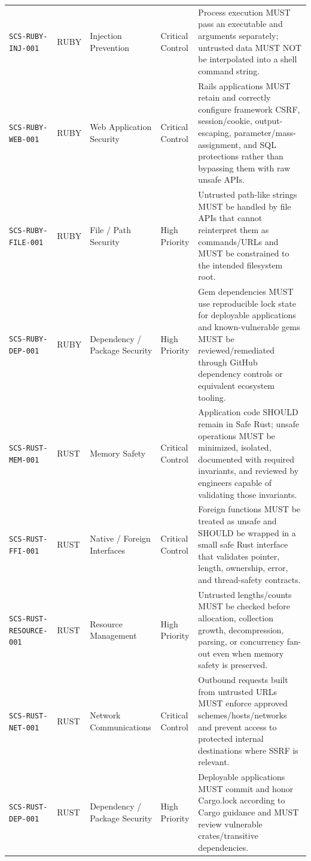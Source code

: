 \documentclass[10pt,letterpaper]{article}
\newcommand{\code}[1]{\begingroup\small\ttfamily\def\UrlFont{\ttfamily}\nolinkurl{#1}\endgroup}
\begin{document}
\begin{landscape}
\begin{longtable}{@{}P{1.3in}P{0.8in}P{1.45in}P{1.0in}P{4.65in}@{}}
\code{SCS-RUBY-INJ-001} & RUBY & Injection Prevention & Critical Control & Process execution MUST pass an executable and arguments separately; untrusted data MUST NOT be interpolated into a shell command string.\\
\code{SCS-RUBY-WEB-001} & RUBY & Web Application Security & Critical Control & Rails applications MUST retain and correctly configure framework CSRF, session/cookie, output-escaping, parameter/mass-assignment, and SQL protections rather than bypassing them with raw unsafe APIs.\\
\code{SCS-RUBY-FILE-001} & RUBY & File / Path Security & High Priority & Untrusted path-like strings MUST be handled by file APIs that cannot reinterpret them as commands/URLs and MUST be constrained to the intended filesystem root.\\
\code{SCS-RUBY-DEP-001} & RUBY & Dependency / Package Security & High Priority & Gem dependencies MUST use reproducible lock state for deployable applications and known-vulnerable gems MUST be reviewed/remediated through GitHub dependency controls or equivalent ecosystem tooling.\\
\code{SCS-RUST-MEM-001} & RUST & Memory Safety & Critical Control & Application code SHOULD remain in Safe Rust; unsafe operations MUST be minimized, isolated, documented with required invariants, and reviewed by engineers capable of validating those invariants.\\
\code{SCS-RUST-FFI-001} & RUST & Native / Foreign Interfaces & Critical Control & Foreign functions MUST be treated as unsafe and SHOULD be wrapped in a small safe Rust interface that validates pointer, length, ownership, error, and thread-safety contracts.\\
\code{SCS-RUST-RESOURCE-001} & RUST & Resource Management & High Priority & Untrusted lengths/counts MUST be checked before allocation, collection growth, decompression, parsing, or concurrency fan-out even when memory safety is preserved.\\
\code{SCS-RUST-NET-001} & RUST & Network Communications & Critical Control & Outbound requests built from untrusted URLs MUST enforce approved schemes/hosts/networks and prevent access to protected internal destinations where SSRF is relevant.\\
\code{SCS-RUST-DEP-001} & RUST & Dependency / Package Security & High Priority & Deployable applications MUST commit and honor Cargo.lock according to Cargo guidance and MUST review vulnerable crates/transitive dependencies.\\

\end{longtable}
\end{landscape}
\end{document}

